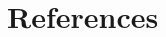 \documentclass[a4paper]{jpconf}
\begin{document}
\section*{References}

\begin{thebibliography}{30}












\end{thebibliography}
\end{document}

